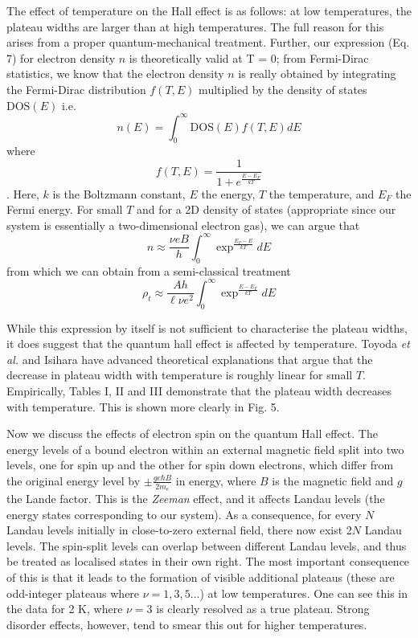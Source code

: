\documentclass[aps,prl,nofootinbib,twocolumn,superscriptaddress,groupedaddress]{revtex4}  %
\begin{document}
The effect of temperature on the Hall effect is as follows: at low temperatures, the plateau widths are larger than at high temperatures. The full reason for this arises from a proper quantum-mechanical treatment. Further, our expression (Eq. 7)  for electron density $n$ is theoretically valid at T = 0; from Fermi-Dirac statistics, we know that the electron density $n$ is really obtained by integrating the Fermi-Dirac distribution $f(T,E)$ multiplied by the density of states $\mathrm{DOS}(E)$ i.e. \begin{equation}
n(E) = \int_{0}^{\infty}\mathrm{DOS}(E)f(T,E) dE
\end{equation}
where $$f(T,E) = \frac{1}{1 + e^{\frac{E - E_{F}}{kT}}}$$. Here, $k$ is the Boltzmann constant, $E$ the energy, $T$ the temperature, and $E_{F}$ the Fermi energy. For small $T$ and for a 2D density of states (appropriate since our system is essentially a two-dimensional electron gas), we can argue that $$n \approx \frac{\nu e B}{h}\int_{0}^{\infty}\exp^{\frac{E_{F} - E}{kT}} dE$$
from which we can obtain from a semi-classical treatment 
\begin{equation}
\rho_{t} \approx \frac{Ah}{\ell\nu e^{2}}\int_{0}^{\infty}\exp^{\frac{E - E_{F}}{kT}} dE
\end{equation}

While this expression by itself is not sufficient to characterise the plateau widths, it does suggest that the quantum hall effect is affected by temperature. Toyoda \textit{et al.}\cite{toyoda} and Isihara\cite{isihara} have advanced theoretical explanations that argue that the decrease in plateau width with temperature is roughly linear for small $T$. Empirically, Tables I, II and III demonstrate that the plateau width decreases with temperature. This is shown more clearly in Fig. 5.

Now we discuss the effects of electron spin on the quantum Hall effect. The energy levels of a bound electron within an external magnetic field split into two levels, one for spin up and the other for spin down electrons, which differ from the original energy level by $\pm\frac{ge\hbar B}{2m_{e}}$ in energy, where $B$ is the magnetic field and $g$ the Lande factor. This is the \textit{Zeeman} effect, and it affects Landau levels (the energy states corresponding to our system). As a consequence, for every $N$ Landau levels initially in close-to-zero external field, there now exist 2$N$ Landau levels. The spin-split levels can overlap between different Landau levels, and thus be treated as localised states in their own right. The most important consequence of this is that it leads to the formation of visible additional plateaus (these are odd-integer plateaus where $\nu = 1, 3, 5 \ldots$) at low temperatures\cite{murzin}.  One can see this in the data for 2 K, where $\nu = 3$ is clearly resolved as a true plateau. Strong disorder effects, however, tend to smear this out for higher temperatures\cite{murzin}.
\end{document}
